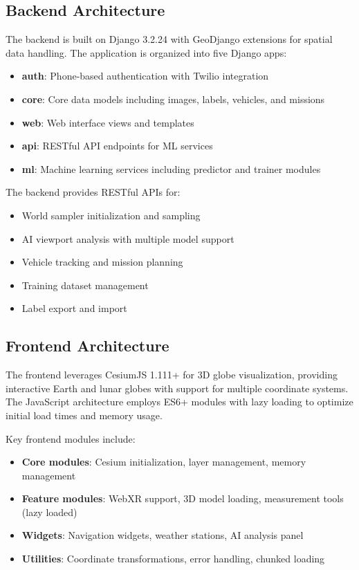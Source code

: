 \documentclass[conference]{IEEEtran}
\begin{document}
\subsection{Backend Architecture}

The backend is built on Django 3.2.24 with GeoDjango extensions for spatial data handling. The application is organized into five Django apps:

\begin{itemize}
    \item \textbf{auth}: Phone-based authentication with Twilio integration
    \item \textbf{core}: Core data models including images, labels, vehicles, and missions
    \item \textbf{web}: Web interface views and templates
    \item \textbf{api}: RESTful API endpoints for ML services
    \item \textbf{ml}: Machine learning services including predictor and trainer modules
\end{itemize}

The backend provides RESTful APIs for:
\begin{itemize}
    \item World sampler initialization and sampling
    \item AI viewport analysis with multiple model support
    \item Vehicle tracking and mission planning
    \item Training dataset management
    \item Label export and import
\end{itemize}

\subsection{Frontend Architecture}

The frontend leverages CesiumJS 1.111+ for 3D globe visualization, providing interactive Earth and lunar globes with support for multiple coordinate systems. The JavaScript architecture employs ES6+ modules with lazy loading to optimize initial load times and memory usage.

Key frontend modules include:
\begin{itemize}
    \item \textbf{Core modules}: Cesium initialization, layer management, memory management
    \item \textbf{Feature modules}: WebXR support, 3D model loading, measurement tools (lazy loaded)
    \item \textbf{Widgets}: Navigation widgets, weather stations, AI analysis panel
    \item \textbf{Utilities}: Coordinate transformations, error handling, chunked loading
\end{itemize}
\end{document}
